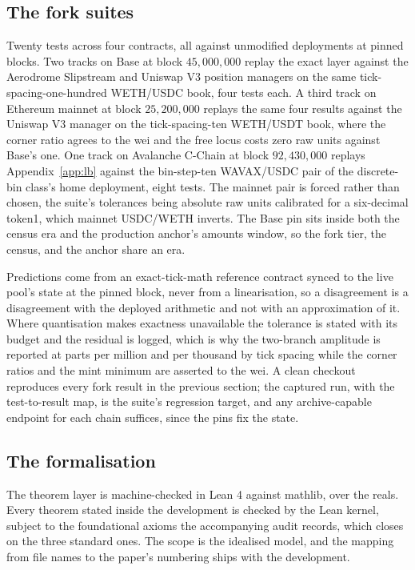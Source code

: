 \documentclass[11pt,a4paper]{article}
\theoremstyle{definition}
\theoremstyle{plain}
\theoremstyle{remark}
\begin{document}
\subsection{The fork suites}\label{sec:forksuites}

Twenty tests across four contracts, all against unmodified deployments at pinned blocks. Two tracks on Base at block $45{,}000{,}000$ replay the exact layer against the Aerodrome Slipstream 
and Uniswap V3 position managers on the same tick-spacing-one-hundred WETH/USDC book, four tests each. A third track on Ethereum mainnet at block $25{,}200{,}000$ replays the same four results 
against the Uniswap V3 manager on the tick-spacing-ten WETH/USDT book, where the corner ratio agrees to the wei and the free locus costs zero raw units against Base's one. One track on 
Avalanche C-Chain at block $92{,}430{,}000$ replays Appendix~\ref{app:lb} against the bin-step-ten WAVAX/USDC pair of the discrete-bin class's home deployment, eight tests. The mainnet 
pair is forced rather than chosen, the suite's tolerances being absolute raw units calibrated for a six-decimal token1, which mainnet USDC/WETH inverts. The Base pin sits inside both the 
census era and the production anchor's amounts window, so the fork tier, the census, and the anchor share an era.

Predictions come from an exact-tick-math reference contract synced to the live pool's state at the pinned block, never from a linearisation, so a disagreement is a disagreement with the 
deployed arithmetic and not with an approximation of it. Where quantisation makes exactness unavailable the tolerance is stated with its budget and the residual is logged, which is why 
the two-branch amplitude is reported at parts per million and per thousand by tick spacing while the corner ratios and the mint minimum are asserted to the wei. A clean checkout reproduces 
every fork result in the previous section; the captured run, with the test-to-result map, is the suite's regression target, and any archive-capable endpoint for each chain suffices, 
since the pins fix the state.

\subsection{The formalisation}\label{sec:lean}

The theorem layer is machine-checked in Lean 4 against mathlib, over the reals. Every theorem stated inside the development is checked by the Lean kernel, subject to the foundational 
axioms the accompanying audit records, which closes on the three standard ones. The scope is the idealised model, and the mapping from file names to the paper's numbering ships with 
the development.
\end{document}
